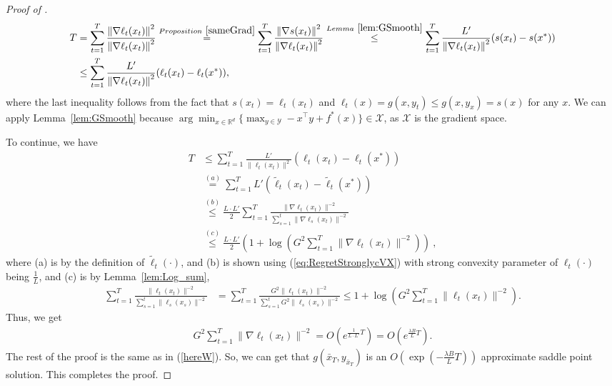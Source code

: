 \documentclass[final,12pt]{colt2018} %
\def\reals{\mathbb{R}}
\def\reals{\mathbb{R}}
\newcommand{\norm}[1]{\left\lVert#1\right\rVert}
\newcommand{\norme}[1]{\norm{#1}}
\newcommand{\yx}[1]{y_{#1}}
\newcommand{\XX}{\mathcal{X}}
\newcommand{\YY}{\mathcal{Y}}
\begin{document}
\begin{proof}[Proof of ]
\begin{comment}
We are now ready to prove the theorem.
\end{comment}

\begin{align}
T &= \sum_{t=1}^T \frac{\norme{ \nabla \ell_t(x_t)}^2}{\norme{ \nabla \ell_t(x_t)}^2}
\overset{Proposition~\ref{sameGrad}}{ = }\sum_{t=1}^T \frac{\norme{\nabla s(x_t)}^2}{\norme{ \nabla \ell_t(x_t)}^2}
\overset{Lemma~\ref{lem:GSmooth}}{ \le} \sum_{t=1}^T \frac{L'}{\norme{ \nabla \ell_t(x_t)}^2} (s(x_t) - s(x^*))\\
&\le \sum_{t=1}^T \frac{L'}{\norme{ \nabla \ell_t(x_t)}^2} (\ell_t(x_t) - \ell_t(x^*))\label{eq:normal},
\end{align}
where the last inequality follows from the fact that $s(x_t) = \ell_t(x_t)$ and $\ell_t(x) = g(x,y_t) \le g(x,\yx{x}) = s(x)$ for any $x$. We can apply Lemma~\ref{lem:GSmooth} because 
$\arg\min_{x \in \reals^d} \{ \max_{y \in \YY} - x^\top y + f^*(x) \} \in \XX$, as $\XX$ is the gradient space. 

To continue, we have
\begin{equation} \label{eq:ExpRate}
\begin{aligned}
T & \leq
\sum_{t=1}^T \frac{{ L' }}{\| \ell_t( x_t) \|^2} ( \ell_t(x_t)-\ell_t(x^*) )  \nonumber \\
&\overset{(a)}{=}
\sum_{t=1}^T L' ( \tilde{\ell}_t(x_t)-\tilde{\ell}_t(x^*) )  \nonumber \\
&\overset{(b)}{\le}
\frac{L\cdot L'}{2} \sum_{t=1}^T \frac{\| \nabla \ell_t( x_t) \|^{-2}}{\sum_{s=1}^t \|\nabla \ell_s(x_t) \|^{-2}}\nonumber \\
&\overset{(c)}{\le}
\frac{L\cdot L'}{2}\left( 1+\log(G^2 \sum_{t=1}^T\|\nabla \ell_t( x_t)\|^{-2}) \right)~,
\end{aligned}
\end{equation}
where (a) is by the definition of $\tilde{\ell}_t(\cdot)$,
and (b) is shown using (\ref{eq:RegretStronglycVX}) with strong convexity parameter of $\ell_t(\cdot)$ being $\frac{1}{L}$, and (c) is by Lemma~\ref{lem:Log_sum},
\begin{align*}
\sum_{t=1}^T \frac{\| \ell_t( x_t) \|^{-2}}{\sum_{s=1}^t \| \ell_s( x_s) \|^{-2}}
&=
\sum_{t=1}^T \frac{G^2\| \ell_t( x_t) \|^{-2}}{\sum_{s=1}^t G^2\| \ell_s( x_s) \|^{-2}}
\leq{}
{1+\log(G^2 \sum_{t=1}^T\| \ell_t( x_t)\|^{-2})}.
\end{align*}
Thus, we get
\begin{align} 
G^2 \sum_{t=1}^T \| \nabla \ell_t(x_t) \|^{-2} = O(  e^{\frac{1}{L\cdot L'}T}) =  O(  e^{\frac{\lambda B}{L}T}).
\end{align}
The rest of the proof is the same as in (\ref{hereW}). 
So, we can get that $g(\bar{x}_T, \yx{\bar{x}_T})$ is an $O(\exp(-\frac{\lambda B}{L}T))$ approximate saddle point solution. This completes the proof.

\end{proof}
\end{document}
